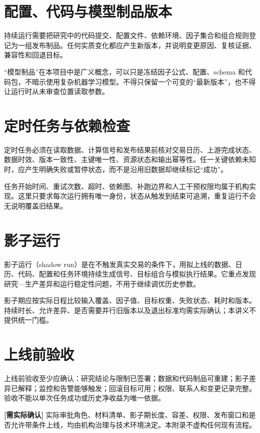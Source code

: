 \section{配置、代码与模型制品版本}

持续运行需要把研究中的代码提交、配置文件、依赖环境、因子集合和组合规则登记为一组发布制品。任何实质变化都应产生新版本，并说明变更原因、复核证据、兼容性和回退目标。

“模型制品”在本项目中是广义概念，可以只是冻结因子公式、配置、schema 和代码包，不暗示使用复杂机器学习模型。不得只保留一个可变的“最新版本”，也不得让运行时从未审查位置读取参数。

\section{定时任务与依赖检查}

定时任务必须在读取数据、计算信号和发布结果前核对交易日历、上游完成状态、数据时效、版本一致性、主键唯一性、资源状态和输出幂等性。任一关键依赖未知时，应产生明确失败或暂停状态，而不是沿用旧数据却继续标记“成功”。

任务开始时间、重试次数、超时、依赖图、补跑边界和人工干预权限均属于机构实现。这里只要求每次运行拥有唯一身份，状态从触发到结束可追溯，重复运行不会无说明覆盖旧结果。

\section{影子运行}

影子运行（shadow run）是在不触发真实交易的条件下，用拟上线的数据、日历、代码、配置和任务环境持续生成信号、目标组合与模拟执行结果。它重点发现研究—生产差异和运行稳定性问题，不用于继续调优历史参数。

影子期应按实际日程比较输入覆盖、因子值、目标权重、失败状态、耗时和版本。持续时长、允许差异、是否需要并行旧版本以及退出标准均需实际确认；本讲义不提供统一门槛。

\section{上线前验收}

上线前验收至少应确认：研究结论与限制已签署；数据和代码制品可重建；影子差异已解释；监控和告警能够触发；回滚目标可用；权限、联系人和变更记录完整。验收不能以单次任务成功或历史净收益为唯一依据。

\begin{confirmbox}
\textbf{[需实际确认]} 实际审批角色、材料清单、影子期长度、容差、权限、发布窗口和是否允许带条件上线，均由机构治理与技术环境决定。本附录不虚构任何现有流程。
\end{confirmbox}

